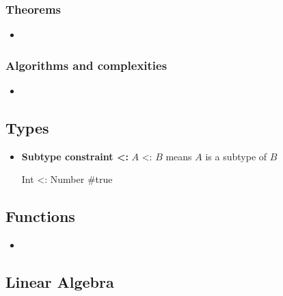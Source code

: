 \documentclass{report}
\begin{document}
    \pagebreak 
    \subsubsection{Theorems}
    \begin{itemize}
        \item \relax   
    \end{itemize}

    \pagebreak 
    \subsubsection{Algorithms and complexities}
    \begin{itemize}
        \item \relax
    \end{itemize}



    \pagebreak 
    \bigbreak \noindent 
    \subsection{Types}
    \bigbreak \noindent 
    \begin{itemize}
        \item \textbf{Subtype constraint <:} $A$ <: $B$ means $A$ is a subtype of $B$
            \bigbreak \noindent 
            \begin{jlcode}
            Int <: Number #true
            \end{jlcode}
    \end{itemize}

    \pagebreak 
    \subsection{Functions}
    \begin{itemize}
        \item \relax    
    \end{itemize}

    \pagebreak 
    \subsection{Linear Algebra}
    \bigbreak \noindent 
\end{document}
